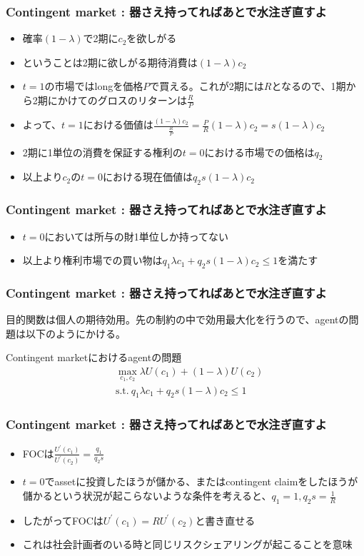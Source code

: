 \documentclass[dvipdfmx, 12pt]{beamer}
\begin{document}
\begin{frame}\frametitle{Contingent market : \small 器さえ持ってればあとで水注ぎ直すよ}
	\begin{itemize}
		\item 確率$(1 -\lambda)$で2期に$c_2$を欲しがる
		\item ということは2期に欲しがる期待消費は$(1 - \lambda) c_2$
		\item $t = 1$の市場ではlongを価格$P$で買える。これが2期には$R$となるので、1期から2期にかけてのグロスのリターンは$\frac{R}{P}$
		\item よって、$t = 1$における価値は$\frac{(1 - \lambda) c_2}{\frac{R}{P}} = \frac{P}{R} (1 - \lambda) c_2 = s (1 - \lambda) c_2$
		\item 2期に1単位の消費を保証する権利の$t = 0$における市場での価格は$q_2$
		\item 以上より$c_2$の$t = 0$における現在価値は$q_2 s(1 - \lambda) c_2$
	\end{itemize}
\end{frame}
\begin{frame}\frametitle{Contingent market : \small 器さえ持ってればあとで水注ぎ直すよ}
	\begin{itemize}
		\item $t = 0$においては所与の財1単位しか持ってない
		\item 以上より権利市場での買い物は$q_1 \lambda c_1 + q_2 s(1 - \lambda) c_2 \leq 1$を満たす
	\end{itemize}
\end{frame}
\begin{frame}\frametitle{Contingent market : \small 器さえ持ってればあとで水注ぎ直すよ}
	目的関数は個人の期待効用。先の制約の中で効用最大化を行うので、agentの問題は以下のようにかける。
	\begin{itembox}[l]{Contingent marketにおけるagentの問題}
	\begin{align*}
		&\max_{c_1, c_2} \lambda U(c_1) + (1 - \lambda) U(c_2) \\
		&\text{s.t.}\
    		q_1 \lambda c_1 + q_2 s(1 - \lambda) c_2 \leq 1
	\end{align*}
	\end{itembox}
\end{frame}
\begin{frame}\frametitle{Contingent market : \small 器さえ持ってればあとで水注ぎ直すよ}
	\begin{itemize}
		\item FOCは$\frac{U^{'}(c_1)}{U^{'}(c_2)} = \frac{q_1}{q_2 s}$
		\item $t = 0$でassetに投資したほうが儲かる、またはcontingent claimをしたほうが儲かるという状況が起こらないような条件を考えると、$q_1 = 1, q_2 s = \frac{1}{R}$
		\item したがってFOCは$U^{'}(c_1) = R U^{'}(c_2)$と書き直せる
		\item これは社会計画者のいる時と同じリスクシェアリングが起こることを意味
	\end{itemize}
\end{frame}
\end{document}
